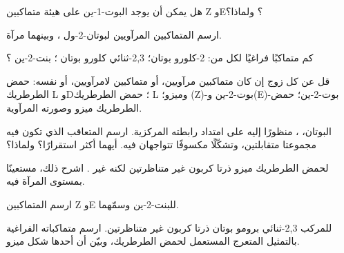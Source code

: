 \begin{exercise}[$\star$]\label{exo:g12:stereochemistry:5}
هل يمكن أن يوجد البوت-1-ين  على هيئة متماكبين Z وE؟ ولماذا؟
\end{exercise}

\begin{exercise}[$\star\star$]\label{exo:g12:stereochemistry:6}
ارسم المتماكبين المرآويين لبوتان-2-ول ، وبينهما
مرآة.
\end{exercise}

\begin{exercise}[$\star\star$]\label{exo:g12:stereochemistry:7}
كم متماكبًا فراغيًا لكل من: 2-كلورو بوتان؛
2,3-ثنائي كلورو بوتان ؛ بنت-2-ين
؟
\end{exercise}

\begin{exercise}[$\star\star$]\label{exo:g12:stereochemistry:8}
قل عن كل زوج إن كان متماكبين مرآويين، أو متماكبين لامرآويين، أو 
نفسه: حمض الطرطريك L وD؛ حمض الطرطريك L وميزو؛ (Z)-بوت-2-ين
و(E)-بوت-2-ين؛ حمض الطرطريك ميزو وصورته المرآوية.
\end{exercise}

\begin{exercise}[$\star\star$]\label{exo:g12:stereochemistry:9}
البوتان، ، منظورًا إليه على امتداد رابطته المركزية. ارسم
 المتعاقب الذي تكون فيه مجموعتا  متقابلتين،
وتشكّلًا مكسوفًا تتواجهان فيه. أيهما أكثر استقرارًا؟
ولماذا؟
\end{exercise}

\begin{exercise}[$\star\star$]\label{exo:g12:stereochemistry:10}
لحمض الطرطريك ميزو ذرتا كربون غير متناظرتين لكنه غير .
اشرح ذلك، مستعينًا بمستوى المرآة فيه.
\end{exercise}

\begin{exercise}[$\star\star$]\label{exo:g12:stereochemistry:11}
ارسم المتماكبين Z وE للبنت-2-ين وسمّهما.
\end{exercise}

\begin{exercise}[$\star\star\star$]\label{exo:g12:stereochemistry:12}
للمركب 2,3-ثنائي برومو بوتان  ذرتا كربون غير متناظرتين.
ارسم متماكباته الفراغية بالتمثيل المتعرج المستعمل لحمض
الطرطريك، وبيّن أن أحدها شكل ميزو.
\end{exercise}

